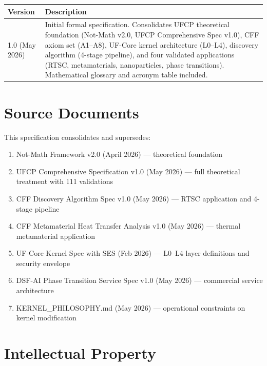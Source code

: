 \documentclass[11pt, a4paper]{article}
\begin{document}
\begin{center}
\begin{tabular}{@{}lp{10cm}@{}}
\toprule
\textbf{Version} & \textbf{Description} \\
\midrule
1.0 (May 2026) & Initial formal specification. Consolidates
  UFCP theoretical foundation (Not-Math v2.0, UFCP Comprehensive
  Spec v1.0), CFF axiom set (A1--A8), UF-Core kernel architecture
  (L0--L4), discovery algorithm (4-stage pipeline), and four
  validated applications (RTSC, metamaterials, nanoparticles,
  phase transitions). Mathematical glossary and acronym table
  included. \\
\bottomrule
\end{tabular}
\end{center}

\section{Source Documents}

This specification consolidates and supersedes:

\begin{enumerate}[nosep]
  \item Not-Math Framework v2.0 (April 2026) --- theoretical
    foundation
  \item UFCP Comprehensive Specification v1.0 (May 2026) ---
    full theoretical treatment with 111 validations
  \item CFF Discovery Algorithm Spec v1.0 (May 2026) ---
    RTSC application and 4-stage pipeline
  \item CFF Metamaterial Heat Transfer Analysis v1.0 (May 2026)
    --- thermal metamaterial application
  \item UF-Core Kernel Spec with SES (Feb 2026) --- L0--L4
    layer definitions and security envelope
  \item DSF-AI Phase Transition Service Spec v1.0 (May 2026) ---
    commercial service architecture
  \item KERNEL\_PHILOSOPHY.md (May 2026) --- operational
    constraints on kernel modification
\end{enumerate}

\section{Intellectual Property}
\end{document}
